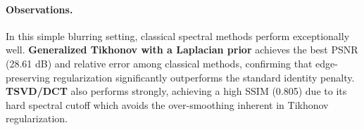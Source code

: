 \documentclass[12pt, a4paper, onecolumn]{article}
\theoremstyle{plain}          %
\theoremstyle{definition}     %
\theoremstyle{remark}
\begin{document}
\begin{table}[t]
\centering
\caption{Average metrics for the \textbf{Weak Deblurring} problem ($\sigma_{\text{blur}}=1.5$, $\sigma_{\text{noise}}=0.01$). Best results for each metric are in \textbf{bold}.}
\label{tab:results_mild}
\end{table}

\paragraph{Observations.}
In this simple blurring setting, classical spectral methods perform exceptionally well. \textbf{Generalized Tikhonov with a Laplacian prior} achieves the best PSNR (28.61 dB) and relative error among classical methods, confirming that edge-preserving regularization significantly outperforms the standard identity penalty. \textbf{TSVD/DCT} also performs strongly, achieving a high SSIM (0.805) due to its hard spectral cutoff which avoids the over-smoothing inherent in Tikhonov regularization. 
\end{document}
